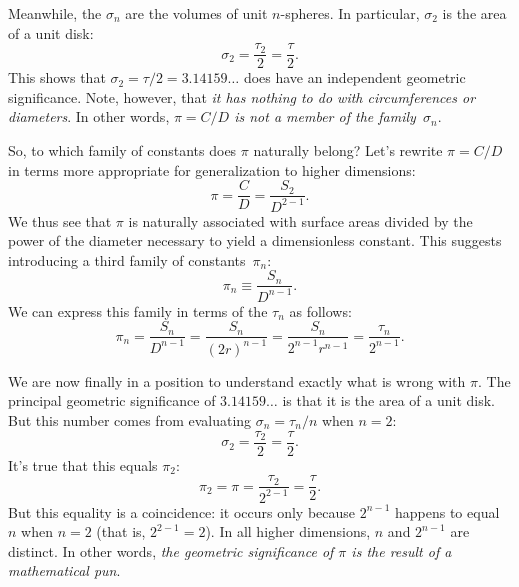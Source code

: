 Meanwhile, the $\sigma_n$ are the volumes of unit $n$-spheres. In particular, $\sigma_2$ is the area of a unit disk:
\[
\sigma_2 = \frac{\tau_2}{2} = \frac{\tau}{2}.
\]
This shows that $\sigma_2 = \tau/2 = 3.14159\ldots$ does have an independent geometric significance. Note, however, that \emph{it has nothing to do with circumferences or diameters}. In other words, \emph{$\pi = C/D$ is not a member of the family~$\sigma_n$}.

So, to which family of constants does $\pi$ naturally belong?
Let's rewrite $\pi = C/D$ in terms more appropriate for generalization to higher dimensions:
\[
\pi = \frac{C}{D} = \frac{S_2}{D^{2-1}}.
\]
We thus see that $\pi$ is naturally associated with surface areas divided by the power of the diameter necessary to yield a dimensionless constant.
This suggests introducing a third family of constants~$\pi_n$:
\[
\pi_n \equiv \frac{S_n}{D^{n-1}}.
\]
We can express this family in terms of the $\tau_n$ as follows:
\[
\pi_n = \frac{S_n}{D^{n-1}} = \frac{S_n}{(2r)^{n-1}} =
\frac{S_n}{2^{n-1}r^{n-1}} = \frac{\tau_n}{2^{n-1}}.
\]

We are now finally in a position to understand exactly what is wrong with $\pi$. The principal geometric significance of $3.14159\ldots$ is that it is the area of a unit disk. But this number comes from evaluating $\sigma_n = \tau_n/n$ when $n=2$:
\[
\sigma_2 = \frac{\tau_2}{2} = \frac{\tau}{2}.
\]
It's true that this equals $\pi_2$:
\[
\pi_2 = \pi = \frac{\tau_2}{2^{2-1}} = \frac{\tau}{2}.
\]
But this equality is a coincidence: it occurs only because $2^{n-1}$ happens to equal $n$ when $n=2$ (that is, $2^{2-1} = 2$). In all higher dimensions, $n$ and $2^{n-1}$ are distinct. In other words, \emph{the geometric significance of $\pi$ is the result of a mathematical pun}.






